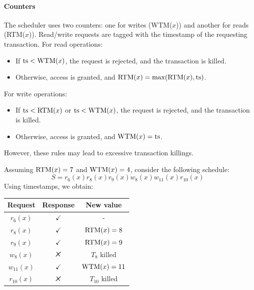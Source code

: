 \paragraph*{Counters}
The scheduler uses two counters: one for writes (WTM($x$)) and another for reads (RTM($x$)).
Read/write requests are tagged with the timestamp of the requesting transaction.
For read operations:
\begin{itemize}
    \item If $\textnormal{ts}<\textnormal{WTM}(x)$, the request is rejected, and the transaction is killed.
    \item Otherwise, access is granted, and $\textnormal{RTM}(x)=\max(\textnormal{RTM}(x),\textnormal{ts})$. 
\end{itemize}
For write operations:
\begin{itemize}
    \item If $\textnormal{ts}<\textnormal{RTM}(x)$ or $\textnormal{ts}<\textnormal{WTM}(x)$, the request is rejected, and the transaction is killed.
    \item Otherwise, access is granted, and $\textnormal{WTM}(x)=\textnormal{ts}$. 
\end{itemize}
However, these rules may lead to excessive transaction killings.
\begin{example}
    Assuming $\textnormal{RTM}(x)=7$ and $\textnormal{WTM}(x)=4$, consider the following schedule:
    \[S=r_6(x) r_8(x) r_9(x) w_8(x) w_{11}(x) r_{10}(x)\]
    Using timestamps, we obtain:
    \begin{table}[H]
        \centering
        \begin{tabular}{ccc}
        \textbf{Request} & \textbf{Response} & \textbf{New value} \\ \hline
        $r_6(x)$         & $\checkmark$      & -                  \\
        $r_8(x)$         & $\checkmark$      & $\textnormal{RTM}(x)=8$         \\
        $r_9(x)$         & $\checkmark$      & $\textnormal{RTM}(x)=9$         \\
        $w_8(x)$         & $\tikzxmark$      & $T_8$ killed       \\
        $w_{11}(x)$      & $\checkmark$      & $\textnormal{WTM}(x)=11$        \\
        $r_{10}(x)$      & $\tikzxmark$      & $T_{10}$ killed   
        \end{tabular}
    \end{table}
\end{example}
